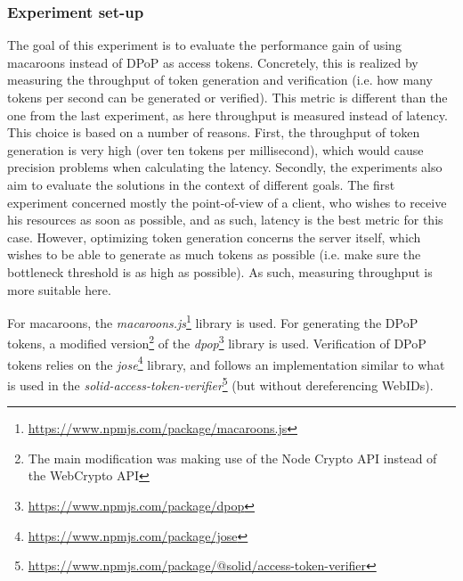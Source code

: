 \subsubsection{Experiment set-up}
The goal of this experiment is to evaluate the performance gain of using macaroons instead of \gls{DPoP} as access tokens. Concretely, this is realized by measuring the throughput of token generation and verification (i.e. how many tokens per second can be generated or verified). This metric is different than the one from the last experiment, as here throughput is measured instead of latency. This choice is based on a number of reasons. First, the throughput of token generation is very high (over ten tokens per millisecond), which would cause precision problems when calculating the latency. Secondly, the experiments also aim to evaluate the solutions in the context of different goals. The first experiment concerned mostly the point-of-view of a client, who wishes to receive his resources as soon as possible, and as such, latency is the best metric for this case. However, optimizing token generation concerns the server itself, which wishes to be able to generate as much tokens as possible (i.e. make sure the bottleneck threshold is as high as possible). As such, measuring throughput is more suitable here.

For macaroons, the \textit{macaroons.js}\footnote{\url{https://www.npmjs.com/package/macaroons.js}} library is used. For generating the \gls{DPoP} tokens, a modified version\footnote{The main modification was making use of the Node Crypto API instead of the WebCrypto API} of the \textit{dpop}\footnote{\url{https://www.npmjs.com/package/dpop}} library is used. Verification of \gls{DPoP} tokens relies on the \textit{jose}\footnote{\url{https://www.npmjs.com/package/jose}} library, and follows an implementation similar to what is used in the \textit{solid-access-token-verifier}\footnote{\url{https://www.npmjs.com/package/@solid/access-token-verifier}} (but without dereferencing WebIDs).

